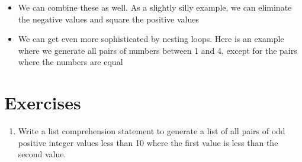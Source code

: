 \documentclass[letterpaper,10pt,english]{sphinxmanual}
\begin{document}
\begin{itemize}
\item {} 
We can combine these as well.  As a slightly silly example, we can
eliminate the negative values and square the positive values

%
\begin{sphinxVerbatim}[commandchars=\\\{\}]
  \PYG{p}{[}       \PYG{p}{]}
\PYG{p}{[}        \PYG{p}{]}
\end{sphinxVerbatim}

\item {} 
We can get even more sophisticated by nesting  loops. Here is
an example where we generate all pairs of numbers between 1 and 4,
except for the pairs where the numbers are equal

%
\begin{sphinxVerbatim}[commandchars=\\\{\}]
\PYG{p}{[}              \PYG{p}{]}
\PYG{g+go}{[(1, 2), (1, 3), (1, 4), (2, 1), (2, 3), (2, 4), (3, 1), (3, 2),}
\PYG{g+go}{    (3, 4), (4, 1), (4, 2), (4, 3)]}
\end{sphinxVerbatim}

\end{itemize}


\section{Exercises}
\label{\detokenize{lecture_notes/lec24_functional:exercises}}\begin{enumerate}
\item {} 
Write a list comprehension statement to generate a list of all
pairs of odd positive integer values less than 10 where the first value is
less than the second value.

\end{enumerate}
\end{document}
